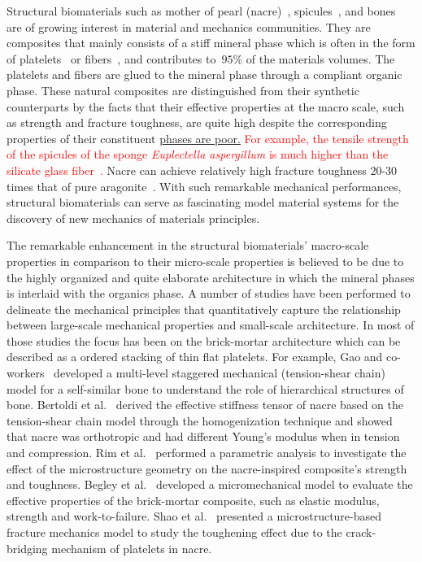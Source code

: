 \documentclass[preprint,10pt,times]{elsarticle}
\numberwithin{equation}{section}
\renewcommand{\>}{$\Rightarrow$}
\begin{document}
Structural biomaterials such as mother of pearl (nacre)~\cite{jackson1988mechanical}, spicules~\cite{monn2015new}, and bones~\cite{wegst2015bioinspired} are of growing interest in material and mechanics communities.
%
They are composites that mainly consists of a stiff mineral phase which is often in the form of platelets~\cite{currey1977mechanical, meyers2008biological, espinosa2011tablet} or fibers~\cite{Aizenberg2005, zhang2011structure, li2015hierarchical}, and contributes to~$95\%$ of the materials volumes.
%
The platelets and fibers are glued to the mineral phase through a compliant organic phase.
%
These natural composites are distinguished from their synthetic counterparts by the facts that their effective properties at the macro scale, such as strength and fracture toughness, are quite high despite the corresponding properties of their constituent \ul{phases are poor.}
%
\textcolor{red}{For example, the tensile strength of the spicules of the sponge \textit{Euplectella aspergillum} is much higher than the silicate glass fiber~\cite{walter2007mechanisms}.}\marginpar{}
%
Nacre can achieve relatively high fracture toughness 20-30 times that of pure aragonite~\cite{tang2007elasto, barthelat2007experimental}.
%
With such remarkable mechanical performances, structural biomaterials can serve as fascinating model material systems for the discovery of new mechanics of materials principles.
%


The remarkable enhancement in the structural biomaterials' macro-scale properties in comparison to their micro-scale properties is believed to be due to the highly organized and quite elaborate architecture in which the mineral phases is interlaid with the organics phase.
A number of studies have been performed to delineate the mechanical principles that quantitatively capture the relationship between large-scale mechanical properties and small-scale architecture.
%
In most of those studies the focus has been on the brick-mortar architecture which can be described as a ordered stacking of thin flat platelets.
%
For example, Gao and co-workers~\cite{gao2006application, ji2010mechanical} developed a multi-level staggered mechanical (tension-shear chain) model for a self-similar bone to understand the role of hierarchical structures of bone.
%
Bertoldi et al.~\cite{bertoldi2008nacre} derived the effective stiffness tensor of nacre based on the tension-shear chain model through the homogenization technique and showed that nacre was orthotropic and had different Young's modulus when in tension and compression.
%
Rim et al.~\cite{rim2011dimensional} performed a parametric analysis to investigate the effect of the microstructure geometry on the nacre-inspired composite's strength and toughness.
%
Begley et al.~\cite{begley2012micromechanical} developed a micromechanical model to evaluate the effective properties of the brick-mortar composite, such as elastic modulus, strength and work-to-failure.
%
Shao et al.~\cite{shao2012discontinuous} presented a microstructure-based fracture mechanics model to study the toughening effect due to the crack-bridging mechanism of platelets in nacre.
%
\end{document}
